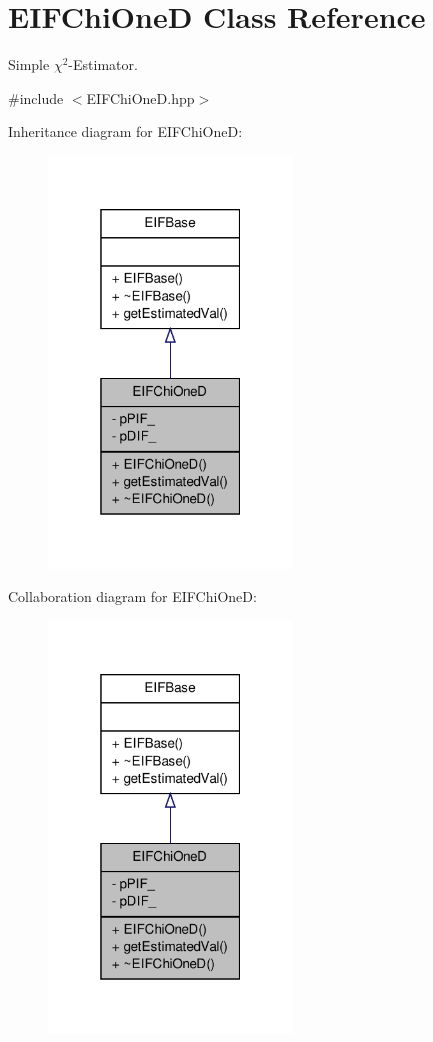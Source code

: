 \hypertarget{classEIFChiOneD}{
\section{EIFChiOneD Class Reference}
\label{db/d1d/classEIFChiOneD}
}


Simple $\chi^{2}$-\/Estimator.  




{\ttfamily \#include $<$EIFChiOneD.hpp$>$}



Inheritance diagram for EIFChiOneD:
\nopagebreak
\begin{figure}[H]
\begin{center}
\leavevmode
\includegraphics[width=184pt]{dc/de7/classEIFChiOneD__inherit__graph}
\end{center}
\end{figure}


Collaboration diagram for EIFChiOneD:
\nopagebreak
\begin{figure}[H]
\begin{center}
\leavevmode
\includegraphics[width=184pt]{d2/db1/classEIFChiOneD__coll__graph}
\end{center}
\end{figure}
